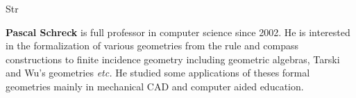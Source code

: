 \begin{sitedescription}{Str}
\begin{compactitem}
\item{\bf Pascal Schreck} is full professor in computer science since 2002. He is interested in the formalization of various geometries from the rule and compass constructions to finite incidence geometry including geometric algebras, Tarski and Wu's geometries \emph{etc.} He studied some applications of theses formal geometries mainly in mechanical CAD and computer aided education.
\end{compactitem}

\end{sitedescription}

